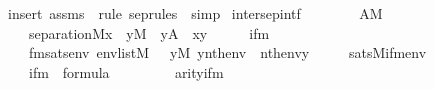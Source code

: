 \begin{isabellebody}
\ {\isacharparenleft}{\kern0pt}insert\ assms\ {\isacharsemicolon}{\kern0pt}\ {\isacharparenleft}{\kern0pt}rule\ sep{\isacharunderscore}{\kern0pt}rules\ {\isacharbar}{\kern0pt}\ simp{\isacharparenright}{\kern0pt}{\isacharplus}{\kern0pt}{\isacharparenright}{\kern0pt}%
\endisatagproof
{\isafoldproof}%
%
\isadelimproof
\isanewline
%
\endisadelimproof
\isanewline
{}\isamarkupfalse%
\ inter{\isacharunderscore}{\kern0pt}sep{\isacharunderscore}{\kern0pt}intf\ {\isacharcolon}{\kern0pt}\isanewline
\ \ \isanewline
\ \ \ \ {\isachardoublequoteopen}A{\isasymin}M{\isachardoublequoteclose}\isanewline
\ \ \isanewline
\ \ \ \ {\isachardoublequoteopen}separation{\isacharparenleft}{\kern0pt}{\isacharhash}{\kern0pt}{\isacharhash}{\kern0pt}M{\isacharcomma}{\kern0pt}{\isasymlambda}x\ {\isachardot}{\kern0pt}\ {\isasymforall}y{\isasymin}M\ {\isachardot}{\kern0pt}\ y{\isasymin}A\ {\isasymlongrightarrow}\ x{\isasymin}y{\isacharparenright}{\kern0pt}{\isachardoublequoteclose}\isanewline
%
\isadelimproof
%
\endisadelimproof
%
\isatagproof
{}\isamarkupfalse%
\ {\isacharminus}{\kern0pt}\isanewline
\ \ \isamarkupfalse%
\ ifm\ \isanewline
\ \ \ \ fmsats{\isacharcolon}{\kern0pt}{\isachardoublequoteopen}{\isasymAnd}env{\isachardot}{\kern0pt}\ env{\isasymin}list{\isacharparenleft}{\kern0pt}M{\isacharparenright}{\kern0pt}\ {\isasymLongrightarrow}\ {\isacharparenleft}{\kern0pt}{\isasymforall}\ y{\isasymin}M{\isachardot}{\kern0pt}\ y{\isasymin}{\isacharparenleft}{\kern0pt}nth{\isacharparenleft}{\kern0pt}{}{\isacharcomma}{\kern0pt}env{\isacharparenright}{\kern0pt}{\isacharparenright}{\kern0pt}\ {\isasymlongrightarrow}\ nth{\isacharparenleft}{\kern0pt}{}{\isacharcomma}{\kern0pt}env{\isacharparenright}{\kern0pt}{\isasymin}y{\isacharparenright}{\kern0pt}\isanewline
\ \ \ \ {\isasymlongleftrightarrow}\ sats{\isacharparenleft}{\kern0pt}M{\isacharcomma}{\kern0pt}ifm{\isacharparenleft}{\kern0pt}{}{\isacharcomma}{\kern0pt}{}{\isacharparenright}{\kern0pt}{\isacharcomma}{\kern0pt}env{\isacharparenright}{\kern0pt}{\isachardoublequoteclose}\isanewline
\ \ \ \ \isanewline
\ \ \ \ {\isachardoublequoteopen}ifm{\isacharparenleft}{\kern0pt}{}{\isacharcomma}{\kern0pt}{}{\isacharparenright}{\kern0pt}\ {\isasymin}\ formula{\isachardoublequoteclose}\isanewline
\ \ \ \ \isanewline
\ \ \ \ {\isachardoublequoteopen}arity{\isacharparenleft}{\kern0pt}ifm{\isacharparenleft}{\kern0pt}{}{\isacharcomma}{\kern0pt}{}{\isacharparenright}{\kern0pt}{\isacharparenright}{\kern0pt}\ {\isacharequal}{\kern0pt}\ {}{\isachardoublequoteclose}\isanewline

\end{isabellebody}
